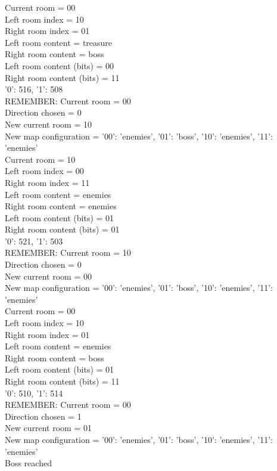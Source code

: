 \documentclass{book}
\theoremstyle{definition}
\theoremstyle{definition}
\theoremstyle{definition}
\theoremstyle{plain}
\theoremstyle{plain}
\theoremstyle{plain}
\theoremstyle{plain}
\begin{document}
\noindent Current room = 00\\
Left room index = 10\\
Right room index = 01\\
Left room content = treasure\\
Right room content = boss\\
Left room content (bits) = 00\\
Right room content (bits) = 11\\
{'0': 516, '1': 508}\\
REMEMBER: Current room = 00\\
Direction chosen = 0\\
New current room = 10\\
New map configuration = {'00': 'enemies', '01': 'boss', '10': 'enemies', '11': 'enemies'}\\
Current room = 10\\
Left room index = 00\\
Right room index = 11\\
Left room content = enemies\\
Right room content = enemies\\
Left room content (bits) = 01\\
Right room content (bits) = 01\\
{'0': 521, '1': 503}\\
REMEMBER: Current room = 10\\
Direction chosen = 0\\
New current room = 00\\
New map configuration = {'00': 'enemies', '01': 'boss', '10': 'enemies', '11': 'enemies'}\\
Current room = 00\\
Left room index = 10\\
Right room index = 01\\
Left room content = enemies\\
Right room content = boss\\
Left room content (bits) = 01\\
Right room content (bits) = 11\\
{'0': 510, '1': 514}\\
REMEMBER: Current room = 00\\
Direction chosen = 1\\
New current room = 01\\
New map configuration = {'00': 'enemies', '01': 'boss', '10': 'enemies', '11': 'enemies'}\\
Boss reached\\
\end{document}
